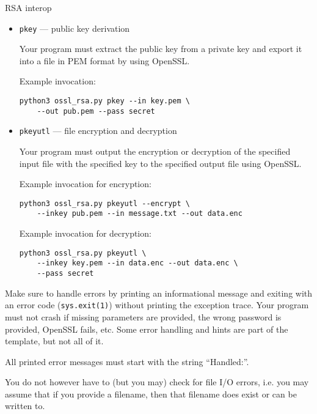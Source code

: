 \documentclass{homework}
\begin{document}
\begin{task}{RSA interop}
\begin{itemize}
    You can see what the expected private key structure looks like by dumping the ASN.1 structure of the example private key given on Moodle.

    Example invocation:
    \begin{Verbatim}
python3 ossl_rsa.py genpkey --out key.pem --pass secret
    \end{Verbatim}

    \item \texttt{pkey} --- public key derivation
    
    Your program must extract the public key from a private key and export it into a file in PEM format by using OpenSSL.

    Example invocation:
    \begin{Verbatim}
python3 ossl_rsa.py pkey --in key.pem \
    --out pub.pem --pass secret
    \end{Verbatim}

    \item \texttt{pkeyutl} --- file encryption and decryption
    
    Your program must output the encryption or decryption of the specified input file with the specified key to the specified output file using OpenSSL.

    Example invocation for encryption:
    \begin{Verbatim}
python3 ossl_rsa.py pkeyutl --encrypt \
    --inkey pub.pem --in message.txt --out data.enc
    \end{Verbatim}

    Example invocation for decryption:
    \begin{Verbatim}
python3 ossl_rsa.py pkeyutl \
    --inkey key.pem --in data.enc --out data.enc \
    --pass secret
    \end{Verbatim}
  \end{itemize}

  Make sure to handle errors by printing an informational message and exiting with an error code (\texttt{sys.exit(1)}) without printing the exception trace.
  Your program must not crash if missing parameters are provided, the wrong password is provided, OpenSSL fails, etc.
  Some error handling and hints are part of the template, but not all of it.

  All printed error messages must start with the string \enquote{Handled:}.

  You do not however have to (but you may) check for file I/O errors, i.e. you may assume that if you provide a filename, then that filename does exist or can be written to.


\end{task}
\end{document}
